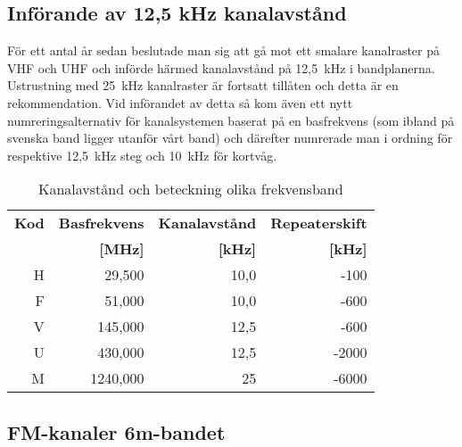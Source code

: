 \subsection{Införande av 12,5 kHz kanalavstånd}

För ett antal år sedan beslutade man sig att gå mot ett smalare kanalraster på
VHF och UHF och införde härmed kanalavstånd på 12,5~kHz i bandplanerna.
Ustrustning med 25~kHz kanalraster är fortsatt tillåten och detta är en
rekommendation. Vid införandet av detta så kom även ett nytt
numreringsalternativ för kanalsystemen baserat på en basfrekvens (som ibland
på svenska band ligger utanför vårt band) och därefter numrerade man i ordning
för respektive 12,5~kHz steg och 10~kHz för kortvåg.

\begin{table}[h]
\centering
\begin{tabular}{rrrr}
	\bf Kod & \bf Basfrekvens & \bf Kanalavstånd & \bf Repeaterskift \\
	        &      \bf  [MHz] &        \bf [kHz] &         \bf [kHz] \\ \hline
	      H &          29,500 &             10,0 &              -100 \\
	      F &          51,000 &             10,0 &              -600 \\
	      V &         145,000 &             12,5 &              -600 \\
	      U &         430,000 &             12,5 &             -2000 \\
	      M &        1240,000 &               25 &             -6000
\end{tabular}
\label{tab:kanalavstand}
\caption{Kanalavstånd och beteckning olika frekvensband}
\end{table}

\subsection{FM-kanaler 6m-bandet}

